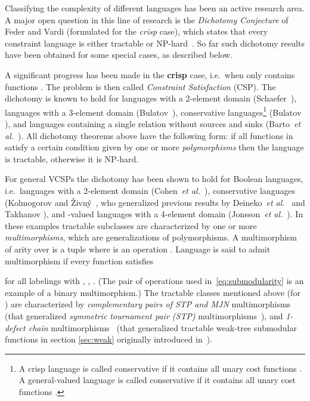 \documentclass[11pt,onecolumn]{article}
\def\etal{{\em et al.}}
\begin{document}
Classifying the complexity of different languages has been an active research area.
A major open question in this line of research is the
\emph{Dichotomy Conjecture} of Feder and Vardi (formulated for the {\em crisp} case), which states that every
constraint language is either tractable or NP-hard~\cite{Feder98:monotone}.
So far such dichotomy results have been obtained for some special cases, as described below.

A significant progress has been made in the {\bf crisp} case, i.e.\ when  only contains functions .
The problem is then called {\em Constraint Satisfaction} (CSP). The dichotomy is known to hold 
for languages with a 2-element domain (Schaefer~\cite{Schaefer78:complexity}),
languages with a 3-element domain (Bulatov~\cite{Bulatov06:3-elementJACM}),
conservative languages\footnote{A crisp language  is called conservative if it contains all unary cost functions  \cite{Bulatov03:conservative}.
A general-valued language is called conservative if it contains all unary cost functions  \cite{KZ10:TRa,KZ10:TRb,K10:TRc}.
} (Bulatov \cite{Bulatov03:conservative}),
and languages containing a single relation without sources and sinks (Barto~\etal\ \cite{Barto09:siam}).
All dichotomy theorems above have the following form: if all functions in  satisfy a certain
condition given by one or more {\em polymorphisms} then the language is tractable, otherwise it is NP-hard.

For general VCSPs the dichotomy has been shown to hold for Boolean languages, i.e.\ languages with a 2-element domain (Cohen~\etal\ \cite{Cohen:AI06}),
conservative languages (Kolmogorov and \v{Z}ivn\'y~\cite{KZ10:TRa,KZ10:TRb,K10:TRc}, who generalized
previous results by Deineko~\etal~\cite{DeinekoJKK08} and Takhanov \cite{Takhanov10:stacs}),
and -valued languages with a 4-element domain (Jonsson~\etal~\cite{Jonsson:TR11}).
In these examples tractable subclasses are characterized by one or more {\em multimorphisms},
which are generalizations of polymorphisms. A multimorphism of arity  over  is
a tuple  where  is an operation .
Language  is said to admit multimorphism  if every function  satisfies

for all labelings  with , , .
(The pair of operations  used in~\eqref{eq:submodularity} is an example of a binary multimorphism.)
The tractable classes mentioned above (for ) are characterized by 
{\em complementary pairs of STP and MJN} multimorphisms~\cite{KZ10:TRb}
(that generalized {\em symmetric tournament pair (STP)} multimorphisms~\cite{Cohen:TCS08}),
and {\em 1-defect chain} multimorphisms~\cite{Jonsson:TR11}
(that generalized tractable weak-tree submodular functions in section \ref{sec:weak} originally introduced in~\cite{K10:TSv2}).
\end{document}

